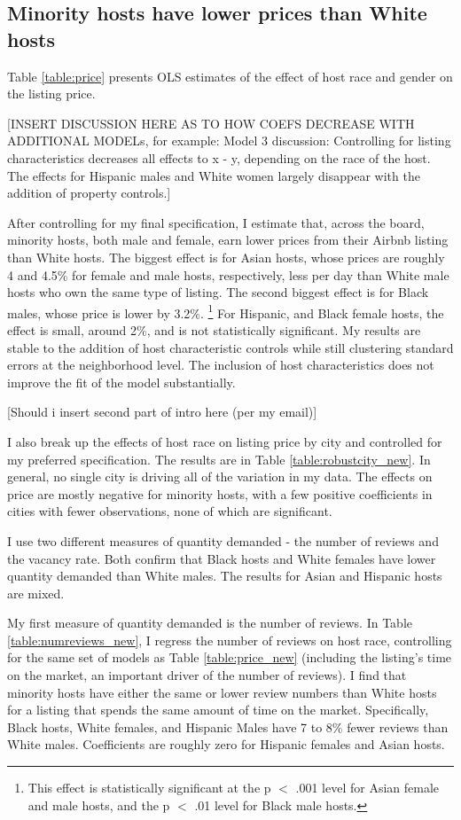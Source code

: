 \subsection*{Minority hosts have lower prices than White hosts} 
	\label{result1}
	

Table \ref{table:price} presents OLS estimates of the effect of host race and gender on the listing price. 

[INSERT DISCUSSION HERE AS TO HOW COEFS DECREASE WITH ADDITIONAL MODELs, for example: Model 3 discussion: Controlling for listing characteristics decreases all effects to x - y, depending on the race of the host. The effects for Hispanic males and White women largely disappear with the addition of property controls.]

After controlling for my final specification, I estimate that, across the board, minority hosts, both male and female, earn lower prices from their Airbnb listing than White hosts. The biggest effect is for Asian hosts, whose prices are roughly 4 and 4.5\% for female and male hosts, respectively, less per day than White male hosts who own the same type of listing. The second biggest effect is for Black males, whose price is lower by 3.2\%.%
	\footnote{This effect is statistically significant at the p $<$ .001 level for Asian female and male hosts, and the p $<$ .01 level for Black male hosts.} 
For Hispanic, and Black female hosts, the effect is small, around 2\%, and is not statistically significant. My results are stable to the addition of host characteristic controls while still clustering standard errors at the neighborhood level. The inclusion of host characteristics does not improve the fit of the model substantially.  

[Should i insert second part of intro here (per my email)]

I also break up the effects of host race on listing price by city and controlled for my preferred specification. The results are in Table \ref{table:robustcity_new}. In general, no single city is driving all of the variation in my data. The effects on price are mostly negative for minority hosts, with a few positive coefficients in cities with fewer observations, none of which are significant. 

I use two different measures of quantity demanded - the number of reviews and the vacancy rate. Both confirm that Black hosts and White females have lower quantity demanded than White males. The results for Asian and Hispanic hosts are mixed. 

My first measure of quantity demanded is the number of reviews. In Table \ref{table:numreviews_new}, I regress the number of reviews on host race, controlling for the same set of models as Table \ref{table:price_new} (including the listing's time on the market, an important driver of the number of reviews). I find that minority hosts have either the same or lower review numbers than White hosts for a listing that spends the same amount of time on the market. Specifically, Black hosts, White females, and Hispanic Males have 7 to 8\% fewer reviews than White males. Coefficients are roughly zero for Hispanic females and Asian hosts. 

